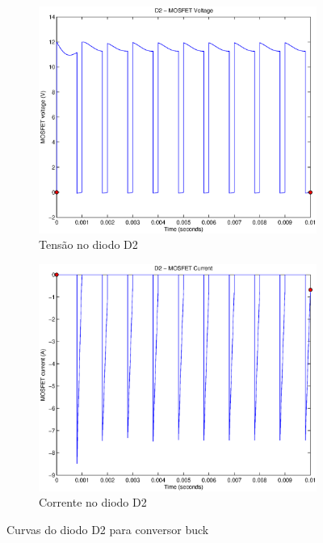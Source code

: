 \documentclass{article}
\begin{document}
\begin{figure}[H]
	\centering
	\begin{subfigure}[b]{0.4\linewidth}
		\includegraphics[width=\linewidth]{matlab/buck/r_d2v}
		\caption{Tensão no diodo D2}
	\end{subfigure}
	\begin{subfigure}[b]{0.4\linewidth}
		\centering
		\includegraphics[width=\linewidth]{matlab/buck/r_d2i}
		\caption{Corrente no diodo D2}
	\end{subfigure}
	\caption{Curvas do diodo D2 para conversor buck}
	\label{fig:bd2}
\end{figure}
\end{document}
